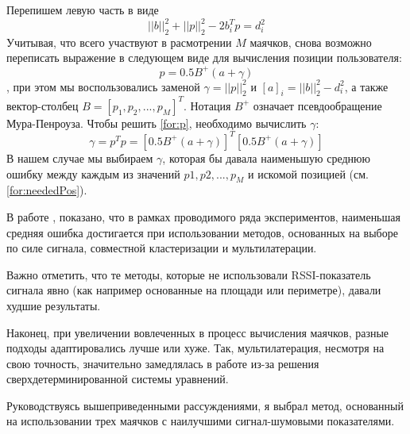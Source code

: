 \begin{enumerate}
\[    \]
    Перепишем левую часть в виде
    \begin{equation} \label{for:neededPos}
            || b ||^2_2 + || p ||^2_2 - 2b_i^Tp = d_i^2    
    \end{equation}
    Учитывая, что всего участвуют в расмотрении $M$ маячков, снова возможно переписать выражение в следующем виде для вычисления позиции пользователя:
    \begin{equation} \label{for:p}
        p = 0.5B^+(a+\gamma)    
    \end{equation}
    , при этом мы воспользовались заменой $\gamma = || p ||^2_2$ и $[a]_i = || b ||^2_2 - d_i^2$, а также вектор-столбец $B = [p_1, p_2, ..., p_M]^T$. Нотация $B^+$ означает псевдообращение Мура-Пенроуза. Чтобы решить \ref{for:p}, необходимо вычислить $\gamma$:
    \[
        \gamma = p^T p = [0.5B^+(a+\gamma)]^T [0.5B^+(a+\gamma)]
    \]
    В нашем случае мы выбираем $\gamma$, которая бы давала наименьшую среднюю ошибку между каждым из значений $p1, p2, ..., p_M$ и искомой позицией (см. \ref{for:neededPos}). \\
\end{enumerate}

    В работе \cite{artemenko2012comparison}, показано, что в рамках проводимого ряда экспериментов, наименьшая средняя ошибка достигается при использовании методов, основанных на выборе по силе сигнала, совместной кластеризации и мультилатерации. 
    
    Важно отметить, что те методы, которые не использовали RSSI-показатель сигнала явно (как например основанные на площади или периметре), давали худшие результаты. 
    
    Наконец, при увеличении вовлеченных в процесс вычисления маячков, разные подходы адаптировались лучше или хуже. Так, мультилатерация, несмотря на свою точность, значительно замедлялась в работе из-за решения сверхдетерминированной системы уравнений. 
    
    Руководствуясь вышеприведенными рассуждениями, я выбрал метод, основанный на использовании трех маячков с наилучшими сигнал-шумовыми показателями.